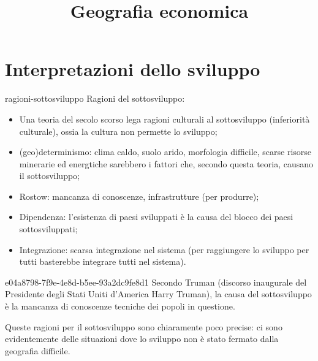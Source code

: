 \documentclass[preview]{standalone}
\begin{document}
\title{Geografia economica}
\genpage

\section{Interpretazioni dello sviluppo}


\begin{snippet}{ragioni-sottosviluppo}
    Ragioni del sottosviluppo:
    \begin{itemize}
        \item Una teoria del secolo scorso lega ragioni culturali al sottosviluppo (inferiorità culturale),
            ossia la cultura non permette lo sviluppo;
        \item (geo)determinismo: clima caldo, suolo arido, morfologia difficile,
            scarse risorse minerarie ed energtiche sarebbero i fattori che, secondo questa teoria, causano il sottosviluppo;
        \item Rostow: mancanza di conoscenze, infrastrutture (per produrre);
        \item Dipendenza: l'esistenza di paesi sviluppati è la causa del blocco dei paesi sottosviluppati;
        \item Integrazione: scarsa integrazione nel sistema (per raggiungere lo sviluppo per tutti basterebbe integrare tutti nel sistema).
    \end{itemize}
\end{snippet}

\begin{snippet}{e04a8798-7f9e-4e8d-b5ee-93a2dc9fe8d1}
    Secondo Truman (discorso inaugurale del Presidente degli Stati Uniti d'America Harry Truman),
    la causa del sottosviluppo è la mancanza di conoscenze tecniche dei popoli in questione.
    
    Queste ragioni per il sottosviluppo sono chiaramente poco precise: ci sono
    evidentemente delle situazioni dove lo sviluppo non è stato fermato dalla geografia difficile.
\end{snippet}


\end{document}
